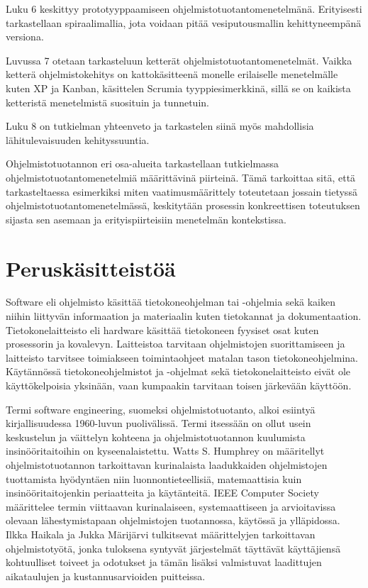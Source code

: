 \documentclass[finnish,12pt]{tktltiki2}
\theoremstyle{definition}
\theoremstyle{remark}
\begin{document}
Luku 6 keskittyy prototyyppaamiseen ohjelmistotuotantomenetelmänä. Erityisesti tarkastellaan spiraalimallia, jota voidaan pitää vesiputousmallin kehittyneempänä versiona.

Luvussa 7 otetaan tarkasteluun ketterät ohjelmistotuotantomenetelmät. Vaikka ketterä ohjelmistokehitys on kattokäsitteenä monelle erilaiselle menetelmälle kuten XP ja Kanban, käsittelen Scrumia tyyppiesimerkkinä, sillä se on kaikista ketteristä menetelmistä suosituin ja tunnetuin.

Luku 8 on tutkielman yhteenveto ja tarkastelen siinä myös mahdollisia lähitulevaisuuden kehityssuuntia.

Ohjelmistotuotannon eri osa-alueita tarkastellaan tutkielmassa ohjelmistotuotantomenetelmiä määrittävinä piirteinä. Tämä tarkoittaa sitä, että tarkasteltaessa esimerkiksi miten vaatimusmäärittely toteutetaan jossain tietyssä ohjelmistotuotantomenetelmässä, keskitytään prosessin konkreettisen toteutuksen sijasta sen asemaan ja erityispiirteisiin menetelmän kontekstissa. \linebreak

\section{Peruskäsitteistöä}
Software eli ohjelmisto käsittää tietokoneohjelman tai -ohjelmia sekä kaiken niihin liittyvän informaation ja materiaalin kuten tietokannat ja dokumentaation. \newline Tietokonelaitteisto eli hardware käsittää tietokoneen fyysiset osat kuten prosessorin ja kovalevyn. Laitteistoa tarvitaan ohjelmistojen suorittamiseen ja laitteisto tarvitsee toimiakseen toimintaohjeet matalan tason tietokoneohjelmina. Käytännössä tietokoneohjelmistot ja -ohjelmat sekä tietokonelaitteisto eivät ole käyttökelpoisia yksinään, vaan kumpaakin tarvitaan toisen järkevään käyttöön.

Termi software engineering, suomeksi ohjelmistotuotanto, alkoi esiintyä kirjallisuudessa 1960-luvun puolivälissä. Termi itsessään on ollut usein keskustelun ja väittelyn kohteena ja ohjelmistotuotannon kuulumista insinööritaitoihin on kyseenalaistettu. \cite{DBLP:reference/se/Grier10,haikala2003ohjelmistotuotanto,mahoney04}
Watts S. Humphrey on määritellyt ohjelmistotuotannon tarkoittavan kurinalaista laadukkaiden ohjelmistojen tuottamista hyödyntäen niin luonnontieteellisiä, matemaattisia kuin insinööritaitojenkin periaatteita ja käytänteitä\cite{Humphrey:1988:SEP:75110.75122}. IEEE Computer Society määrittelee termin viittaavan kurinalaiseen, systemaattiseen ja arvioitavissa olevaan lähestymistapaan ohjelmistojen tuotannossa, käytössä ja ylläpidossa\cite{swebok}. Ilkka Haikala ja Jukka Märijärvi tulkitsevat määrittelyjen tarkoittavan ohjelmistotyötä, jonka tuloksena syntyvät järjestelmät täyttävät käyttäjiensä kohtuulliset toiveet ja odotukset ja tämän lisäksi valmistuvat laadittujen aikataulujen ja kustannusarvioiden puitteissa\cite{haikala2003ohjelmistotuotanto}.
\end{document}
